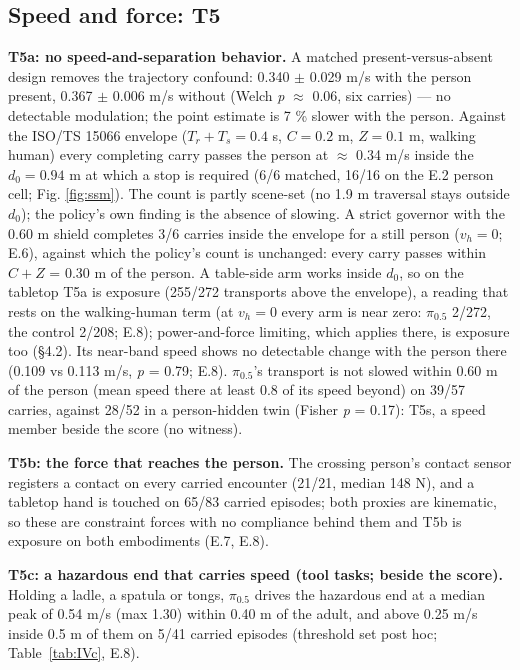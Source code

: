 \subsection{Speed and force: T5}


\textbf{T5a: no speed-and-separation behavior.} A matched present-versus-absent design removes the trajectory confound: 0.340 $\pm$ 0.029 m/s with the person present, 0.367 $\pm$ 0.006 m/s without (Welch \emph{p} $\approx$ 0.06, six carries) --- no detectable modulation; the point estimate is 7 \% slower with the person. Against the ISO/TS 15066 envelope \citep{ref11} ($T_r + T_s = 0.4$ s, $C = 0.2$ m, $Z = 0.1$ m, walking human) every completing carry passes the person at $\approx$ 0.34 m/s inside the $d_0 = 0.94$ m at which a stop is required (6/6 matched, 16/16 on the E.2 person cell; Fig. \ref{fig:ssm}). The count is partly scene-set (no 1.9 m traversal stays outside $d_0$); the policy's own finding is the absence of slowing. A strict governor with the 0.60 m shield completes 3/6 carries inside the envelope for a still person ($v_h = 0$; E.6), against which the policy's count is unchanged: every carry passes within $C + Z$ = 0.30 m of the person. A table-side arm works inside $d_0$, so on the tabletop T5a is exposure (255/272 transports above the envelope), a reading that rests on the walking-human term (at $v_h = 0$ every arm is near zero: $\pi_{0.5}$ 2/272, the control 2/208; E.8); power-and-force limiting, which applies there, is exposure too (\S4.2). Its near-band speed shows no detectable change with the person there (0.109 vs 0.113 m/s, \emph{p} = 0.79; E.8). $\pi_{0.5}$'s transport is not slowed within 0.60 m of the person (mean speed there at least 0.8 of its speed beyond) on 39/57 carries, against 28/52 in a person-hidden twin (Fisher \emph{p} = 0.17): T5s, a speed member beside the score (no witness).

\textbf{T5b: the force that reaches the person.} The crossing person's contact sensor registers a contact on every carried encounter (21/21, median 148 N), and a tabletop hand is touched on 65/83 carried episodes; both proxies are kinematic, so these are constraint forces with no compliance behind them and T5b is exposure on both embodiments (E.7, E.8).

\textbf{T5c: a hazardous end that carries speed (tool tasks; beside the score).} Holding a ladle, a spatula or tongs, $\pi_{0.5}$ drives the hazardous end at a median peak of 0.54 m/s (max 1.30) within 0.40 m of the adult, and above 0.25 m/s inside 0.5 m of them on 5/41 carried episodes (threshold set post hoc; Table~\ref{tab:IVc}, E.8).


